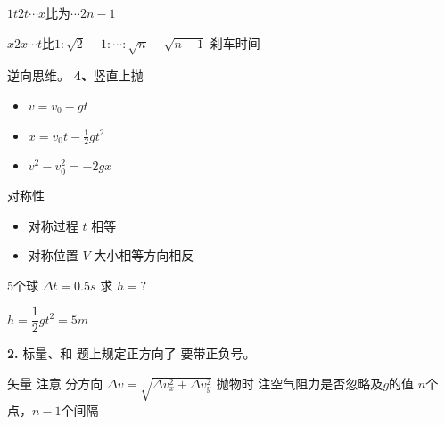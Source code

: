 $1t$\quad $2t$\quad $\cdots$\quad $x$比为\quad $\cdots$\quad $2n-1$

$x$\quad $2x$\quad $\cdots$\quad $t$比\quad $1:\sqrt2-1:\cdots:\sqrt n-\sqrt{n-1}$
刹车时间

逆向思维。
\textbf{4、}竖直上抛
\begin{itemize}
\item $v=v_0-gt$
\item $x=v_0t-\frac12gt^2$
\item $v^2-v_0^2=-2gx$
\end{itemize}
对称性
\begin{itemize}
\item 对称过程 $t$ 相等
\item 对称位置 $V$ 大小相等方向相反
\end{itemize}
\begin{problem}
5个球 $\Delta t=0.5\unit{s}$ 求 $h=?$
\begin{solution}
$h=\dfrac12gt^2=5\unit{m}$
\end{solution}
\end{problem}
\textbf{2.} 标量、和 题上规定正方向了 要带正负号。

矢量 注意 分方向 $\Delta v=\sqrt{\Delta v_x^{2}+\Delta v_y^{2}}$
抛物时 注空气阻力是否忽略及$g$的值 %
$n$个点，$n-1$个间隔

